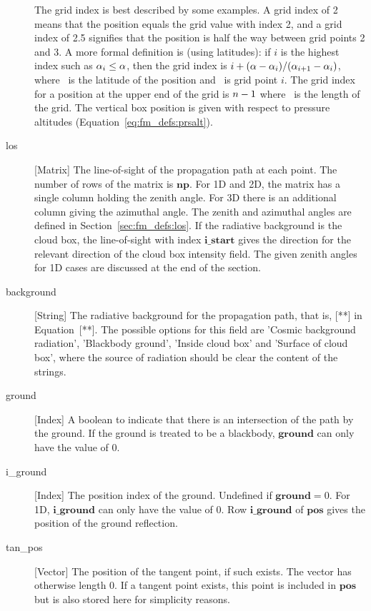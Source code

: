 \begin{description}
     The grid index is best described by some examples. A grid index of
     2 means that the position equals the grid value with index 2, and
     a grid index of 2.5 signifies that the position is half the way between
     grid points 2 and 3. A more formal definition is (using latitudes):
     if $i$ is the highest index such as $\alpha_{i}\leq\alpha$, then the grid
     index is $i+(\alpha-\alpha_{i})/(\alpha_{i+1}-\alpha_{i})$, where \Lat\ is the 
     latitude of the position and \ is grid point $i$. The grid index 
     for a position at the upper end of the grid is $n-1$ where
     \VctLng\ is the length of the grid. The vertical box position is given 
     with respect to pressure altitudes (Equation~\ref{eq:fm_defs:prsalt}).
  \item[los] [Matrix] The line-of-sight of the propagation path at each
     point. The number of rows of the matrix is $\mathbf{np}$. For 1D
     and 2D, the matrix has a single column holding the zenith angle. For 3D
     there is an additional column giving the azimuthal angle. The zenith and
     azimuthal angles are defined in Section~\ref{sec:fm_defs:los}.
     If the radiative background is the cloud box, the line-of-sight
     with index $\mathbf{i\_start}$ gives the direction for the relevant 
     direction of the cloud box intensity field. The given zenith angles for
     1D cases are discussed at the end of the section.    
  \item[background] [String] The radiative background for the propagation path,
     that is, [**] in Equation~[**]. The possible options for this field
     are 'Cosmic background radiation', 'Blackbody ground', 'Inside cloud box'
     and 'Surface of cloud box', where the source of radiation should be clear
     the content of the strings.
  \item[ground] [Index] A boolean to indicate that there is an intersection
     of the path by the ground. If the ground is treated to be a blackbody,
     $\mathbf{ground}$ can only have the value of 0.
  \item[i\_ground] [Index] The position index of the ground. Undefined if 
     $\mathbf{ground}=0$. For 1D, $\mathbf{i\_ground}$ can only have the 
     value of 0. Row $\mathbf{i\_ground}$ of $\mathbf{pos}$ gives the 
     position of the ground reflection.
  \item[tan\_pos] [Vector] The position of the tangent point, if such exists.
     The vector has otherwise length 0. If a tangent point exists, this point
     is included in $\mathbf{pos}$ but is also stored here for simplicity
     reasons.
\end{description}

